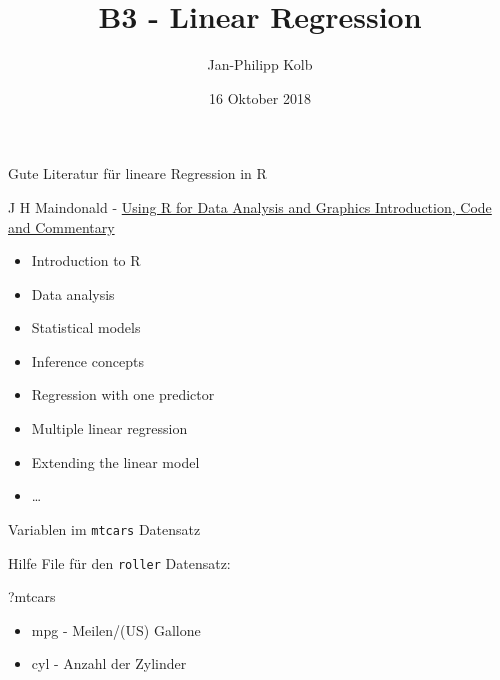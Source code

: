 \documentclass[ignorenonframetext,]{beamer}
\title{B3 - Linear Regression}
\author{Jan-Philipp Kolb}
\date{16 Oktober 2018}
\newenvironment{Shaded}{\begin{snugshade}}{\end{snugshade}}
\newcommand{\NormalTok}[1]{#1}
\providecommand{\tightlist}{%
  \setlength{\itemsep}{0pt}\setlength{\parskip}{0pt}}
\begin{document}
\frame{\titlepage}

\begin{frame}{Gute Literatur für lineare Regression in R}

\begin{block}{J H Maindonald -
\href{https://cran.r-project.org/doc/contrib/usingR.pdf}{Using R for
Data Analysis and Graphics Introduction, Code and Commentary}}

\begin{itemize}
\tightlist
\item
  Introduction to R
\item
  Data analysis
\item
  Statistical models
\item
  Inference concepts
\item
  Regression with one predictor
\item
  Multiple linear regression
\item
  Extending the linear model
\item
  \ldots{}
\end{itemize}

\end{block}

\end{frame}

\begin{frame}[fragile]{Variablen im \texttt{mtcars} Datensatz}

Hilfe File für den \texttt{roller} Datensatz:

\begin{Shaded}
\begin{Highlighting}[]
\NormalTok{?mtcars}
\end{Highlighting}
\end{Shaded}

\begin{itemize}
\tightlist
\item
  mpg - Meilen/(US) Gallone
\item
  cyl - Anzahl der Zylinder
\end{itemize}

\end{frame}
\end{document}
